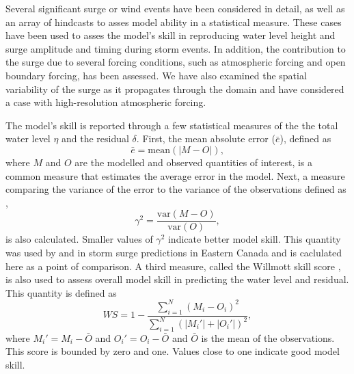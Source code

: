 \documentclass[pdftex,10pt]{article}
\begin{document}
Several significant surge or wind events have been considered in detail, as well as an array of hindcasts to asses model ability in a statistical measure. These cases have been used to asses the model's skill in reproducing water level height and surge amplitude and timing during storm events. In addition, the contribution to the surge due to several forcing conditions, such as atmospheric forcing and open boundary forcing, has been assessed. We have also examined the spatial variability of the surge as it propagates through the domain and have considered a case with high-resolution atmospheric forcing. 

The model's skill is reported through a few statistical measures of the the total water level $\eta$ and the residual $\delta$. First, the mean absolute error ($\bar{e}$), defined as
\begin{equation}
\bar{e} = \text{mean}\left(\left| M - O \right|\right),
\end{equation}
where $M$ and $O$ are the modelled and observed quantities of interest, is a common measure that estimates the average error in the model. Next, a measure comparing the variance of the error to the variance of the observations defined as \citep{thompson2003prediction},
\begin{equation}
\gamma^2 = \frac{\text{var}\left(M-O\right)}{\text{var}\left(O\right)},
\end{equation}
is also calculated. Smaller values of $\gamma^2$ indicate better model skill. This quantity was used by \citet{bernier2006predicting} and \citet{bernier2010tide} in storm surge predictions in Eastern Canada and is caclulated here as a point of comparison. A third measure, called the Willmott skill score \citep{willmott1982some}, is also used to assess overall model skill in predicting the water level and residual. This quantity is defined as
\begin{equation}
WS = 1 - \frac{\sum_{i=1}^N \left(M_i - O_i\right)^2}{\sum_{i=1}^N \left(|M_i'| + |O_i'|\right)^2},
\end{equation} 
where $M_i' = M_i-\bar{O}$ and $O_i'=O_i-\bar{O}$ and $\bar{O}$ is the mean of the observations. This score is bounded by zero and one. Values close to one indicate good model skill. 
\end{document}
